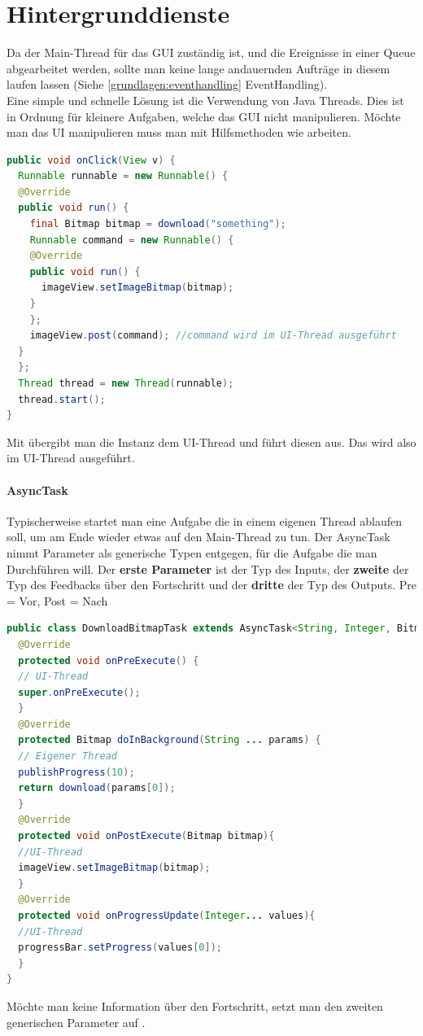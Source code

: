 \section{Hintergrunddienste}
Da der Main-Thread für das GUI zuständig ist, und die Ereignisse in einer Queue abgearbeitet werden, sollte man keine lange andauernden Aufträge in diesem laufen lassen (Siehe \autoref{grundlagen:eventhandling} EventHandling).\\
Eine simple und schnelle Lösung ist die Verwendung von Java Threads. Dies ist in Ordnung für kleinere Aufgaben, welche das GUI nicht manipulieren. Möchte man das UI manipulieren muss man mit Hilfsmethoden wie  arbeiten.
\begin{lstlisting}[language=java]
public void onClick(View v) {
  Runnable runnable = new Runnable() {
  @Override
  public void run() {
    final Bitmap bitmap = download("something");
    Runnable command = new Runnable() {
    @Override
    public void run() {
      imageView.setImageBitmap(bitmap);
    }
    };
    imageView.post(command); //command wird im UI-Thread ausgeführt
  }
  };
  Thread thread = new Thread(runnable);
  thread.start();
}
\end{lstlisting}
Mit  übergibt man die  Instanz dem UI-Thread und führt diesen aus. Das  wird also im UI-Thread ausgeführt.
\paragraph{AsyncTask} Typischerweise startet man eine Aufgabe die in einem eigenen Thread ablaufen soll, um am Ende wieder etwas auf den Main-Thread zu tun. Der AsyncTask nimmt Parameter als generische Typen entgegen, für die Aufgabe die man Durchführen will. Der \textbf{erste Parameter} ist der Typ des Inputs, der \textbf{zweite} der Typ des Feedbacks über den Fortschritt und der \textbf{dritte} der Typ des Outputs. Pre = Vor, Post = Nach
\begin{lstlisting}[language=java]
public class DownloadBitmapTask extends AsyncTask<String, Integer, Bitmap> {
  @Override
  protected void onPreExecute() {
  // UI-Thread
  super.onPreExecute();
  }
  @Override
  protected Bitmap doInBackground(String ... params) {
  // Eigener Thread
  publishProgress(10);
  return download(params[0]);
  }
  @Override
  protected void onPostExecute(Bitmap bitmap){
  //UI-Thread
  imageView.setImageBitmap(bitmap);
  }
  @Override
  protected void onProgressUpdate(Integer... values){
  //UI-Thread
  progressBar.setProgress(values[0]);
  }
}
\end{lstlisting}
Möchte man keine Information über den Fortschritt, setzt man den zweiten generischen Parameter auf .


